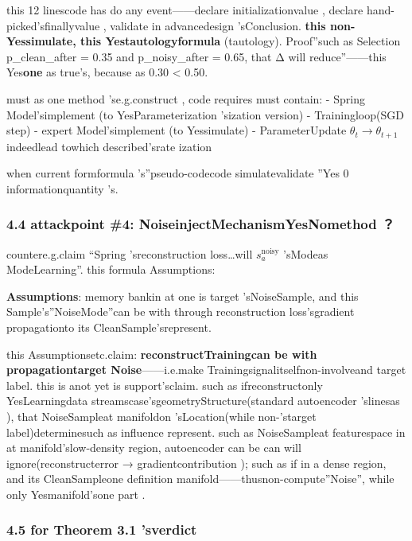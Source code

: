 \documentclass[
  12pt,
]{article}
\begin{document}
this  12
linescode has do any event------declare initializationvalue , declare hand-picked'sfinallyvalue , validate in advancedesign 'sConclusion. \textbf{this non-Yessimulate, this Yestautologyformula }(tautology). Proof''such as Selection
p\_clean\_after = 0.35 and  p\_noisy\_after = 0.65, that  Δ
will reduce''------this Yes\textbf{one }as true's, because as  0.30 \textless{} 0.50. 

must as one method 'se.g.construct , code requires must contain:  - Spring
Model'simplement (to YesParameterization 'sization version) - Trainingloop(SGD step) -
expert Model'simplement (to Yessimulate) - ParameterUpdate
\(\theta_t \to \theta_{t+1}\) indeedlead towhich described'srate ization 

when current formformula 's''pseudo-codecode simulatevalidate ''Yes 0 informationquantity 's. 

\subsubsection{4.4 attackpoint 
\#4: NoiseinjectMechanismYesNomethod ？}\label{ux653bux51fbux70b9-4ux566aux58f0ux6ce8ux5165ux673aux5236ux662fux5426ux5408ux6cd5}

countere.g.claim ``Spring 'sreconstruction loss\ldots will  \(s_a^{\text{noisy}}\)
'sModeas ModeLearning''. this formula Assumptions: 

\textbf{Assumptions}: memory bankin at one is target 'sNoiseSample, and this Sample's''NoiseMode''can be with through reconstruction loss'sgradient propagationto its CleanSample'srepresent. 

this Assumptionsetc.claim: \textbf{reconstructTrainingcan be with propagationtarget Noise}------i.e.make Trainingsignalitselfnon-involveand target label. this is anot yet is support'sclaim. such as ifreconstructonly YesLearningdata streamscase'sgeometryStructure(standard 
autoencoder
'slinesas ), that NoiseSampleat manifoldon 'sLocation(while non-'starget label)determinesuch as influence represent. such as NoiseSampleat featurespace in at manifold'slow-density region, autoencoder
can be can will ignore(reconstructerror  →
gradientcontribution ); such as if in a dense region, and its CleanSampleone definition manifold------thusnon-compute''Noise'', while only Yesmanifold'sone part . 

\subsubsection{4.5 for  Theorem 3.1
'sverdict}\label{ux5bf9-theorem-3.1-ux7684ux5224ux51b3}
\end{document}
